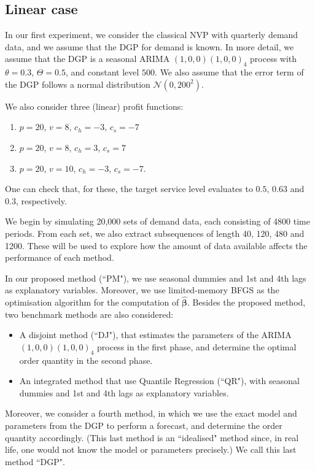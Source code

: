 \documentclass{article}
\begin{document}
\subsection{Linear case} \label{sub:exp1}

In our first experiment, we consider the classical NVP with quarterly demand data, and we assume that the DGP for demand is known. In more detail, we assume that the DGP is a seasonal ARIMA $(1,0,0)(1,0,0)_4$ process with $\theta=0.3$, $\Theta=0.5$, and constant level $500$. We also assume that the error term of the DGP follows a normal distribution $\mathcal{N}(0,200^2)$.

We also consider three (linear) profit functions:
\begin{enumerate}
    \item $p=20$, $v=8$, $c_h=-3$, $c_s=-7$
    \item $p=20$, $v=8$, $c_h=3$, $c_s=7$
    \item $p=20$, $v=10$, $c_h=-3$, $c_s=-7$.
\end{enumerate}
One can check that, for these, the target service level evaluates to
$0.5$, $0.63$ and $0.3$, respectively.

We begin by simulating 20,000 sets of demand data, each consisting of 4800 time periods. From each set, we also extract subsequences of length 40, 120, 480 and 1200. These will be used to explore how the amount of data available affects the performance of each method.

In our proposed method (``PM"), we use seasonal dummies and 1st and 4th lags as explanatory variables. Moreover, we use limited-memory BFGS \cite{LN89} as the optimisation algorithm for the computation of $\hat{\boldsymbol{\beta}}$. Besides the proposed method, two benchmark methods are also considered:
\begin{itemize}
    \item A disjoint method (``DJ"), that estimates the parameters of the ARIMA $(1,0,0)(1,0,0)_4$ process in the first phase, and determine the optimal order quantity in the second phase.
    \item An integrated method that use Quantile Regression (``QR"), with seasonal dummies and 1st and 4th lags as explanatory variables.
\end{itemize}
Moreover, we consider a fourth method, in which we use the exact model and parameters from the DGP to perform a forecast, and determine the order quantity accordingly. (This last method is an ``idealised" method since, in real life, one would not know the model or parameters precisely.) We call this last method ``DGP".
\end{document}
